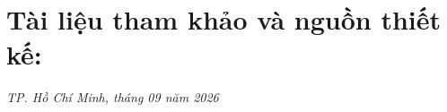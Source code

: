 \documentclass{template/nt106}
\begin{document}
\section{Tài liệu tham khảo và nguồn thiết kế:}
\begingroup
\small
\setlength{\bibitemsep}{0.6ex}
\nocite{labguard2026,rfc9293,rfc8259,rfc8446,rfc6598,uit_nt106_2022,mslearn_sockets,mslearn_networkstream,mslearn_sslstream,mslearn_winforms_threadsafe,mslearn_channels,mslearn_rowversion,mslearn_sql_express_limits,owasp_password_storage,mslearn_dotnet_support,nginx_tcp_lb}
\justifying\printbibliography[heading=none]
\endgroup

\vspace*{1ex}
\hfill\textit{TP. Hồ Chí Minh, tháng 09 năm 2026}
\nopagebreak\printsignature
\end{document}

